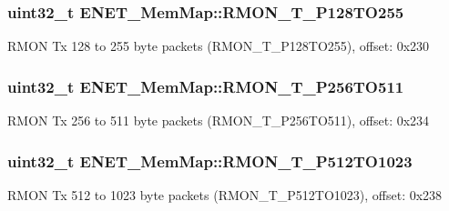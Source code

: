 \subsubsection[{R\+M\+O\+N\+\_\+\+T\+\_\+\+P128\+T\+O255}]{\setlength{\rightskip}{0pt plus 5cm}uint32\+\_\+t E\+N\+E\+T\+\_\+\+Mem\+Map\+::\+R\+M\+O\+N\+\_\+\+T\+\_\+\+P128\+T\+O255}\label{struct_e_n_e_t___mem_map_a36a70fb4e317b97da61411890ee4718b}
R\+M\+O\+N Tx 128 to 255 byte packets (R\+M\+O\+N\+\_\+\+T\+\_\+\+P128\+T\+O255), offset\+: 0x230 \hypertarget{struct_e_n_e_t___mem_map_ada2b5719d5ae06d1d27108d7f2482ac5}{}
\subsubsection[{R\+M\+O\+N\+\_\+\+T\+\_\+\+P256\+T\+O511}]{\setlength{\rightskip}{0pt plus 5cm}uint32\+\_\+t E\+N\+E\+T\+\_\+\+Mem\+Map\+::\+R\+M\+O\+N\+\_\+\+T\+\_\+\+P256\+T\+O511}\label{struct_e_n_e_t___mem_map_ada2b5719d5ae06d1d27108d7f2482ac5}
R\+M\+O\+N Tx 256 to 511 byte packets (R\+M\+O\+N\+\_\+\+T\+\_\+\+P256\+T\+O511), offset\+: 0x234 \hypertarget{struct_e_n_e_t___mem_map_a1fdb9e53b8cfaec93d305731ae79bead}{}
\subsubsection[{R\+M\+O\+N\+\_\+\+T\+\_\+\+P512\+T\+O1023}]{\setlength{\rightskip}{0pt plus 5cm}uint32\+\_\+t E\+N\+E\+T\+\_\+\+Mem\+Map\+::\+R\+M\+O\+N\+\_\+\+T\+\_\+\+P512\+T\+O1023}\label{struct_e_n_e_t___mem_map_a1fdb9e53b8cfaec93d305731ae79bead}
R\+M\+O\+N Tx 512 to 1023 byte packets (R\+M\+O\+N\+\_\+\+T\+\_\+\+P512\+T\+O1023), offset\+: 0x238 \hypertarget{struct_e_n_e_t___mem_map_aabb287e28a91a136a3ff790db65f9041}{}
